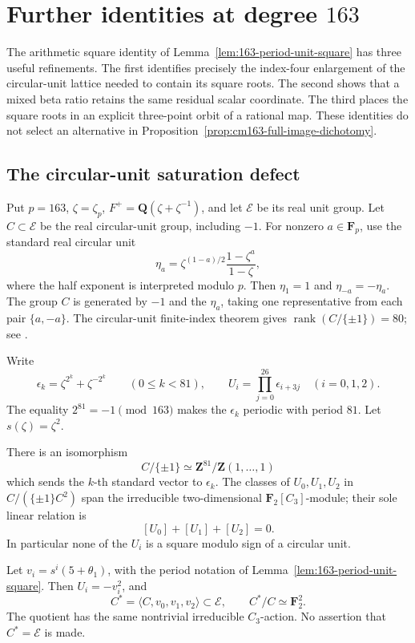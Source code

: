\section{Further identities at degree \(163\)}
\label{sec:163-additional-identities}

The arithmetic square identity of
Lemma~\ref{lem:163-period-unit-square} has three useful refinements.
The first identifies precisely the index-four enlargement of the
circular-unit lattice needed to contain its square roots. The second
shows that a mixed beta ratio retains the same residual scalar
coordinate. The third places the square roots in an explicit
three-point orbit of a rational map. These identities do not select
an alternative in Proposition~\ref{prop:cm163-full-image-dichotomy}.

\subsection{The circular-unit saturation defect}

Put \(p=163\), \(\zeta=\zeta_p\), \(F^+=\mathbf Q(\zeta+\zeta^{-1})\),
and let \(\mathcal E\) be its real unit group.  Let \(C\subset\mathcal E\)
be the real circular-unit group, including \(-1\).  For nonzero
\(a\in\mathbf F_p\), use the standard real circular unit
\[
 \eta_a=\zeta^{(1-a)/2}\frac{1-\zeta^a}{1-\zeta},
\]
where the half exponent is interpreted modulo \(p\).
Then \(\eta_1=1\) and \(\eta_{-a}=-\eta_a\).  The group \(C\)
is generated by \(-1\) and the \(\eta_a\), taking one representative
from each pair \(\{a,-a\}\).
The circular-unit finite-index theorem gives
\(\operatorname{rank}(C/\{\pm1\})=80\); see
\cite[p.~206, the definition and index of \(C\)]{Dummit2020}.

Write
\[
 \epsilon_k=\zeta^{2^k}+\zeta^{-2^k}\qquad(0\leq k<81),
 \qquad
 U_i=\prod_{j=0}^{26}\epsilon_{i+3j}\quad(i=0,1,2).
\]
The equality \(2^{81}=-1\pmod {163}\) makes the \(\epsilon_k\)
periodic with period \(81\).  Let \(s(\zeta)=\zeta^2\).

\begin{proposition}
\label{prop:163-circular-unit-saturation}
There is an isomorphism
\[
 C/\{\pm1\}\simeq
 \mathbf Z^{81}/\mathbf Z(1,\ldots,1)
\]
which sends the \(k\)-th standard vector to \(\epsilon_k\).
The classes of \(U_0,U_1,U_2\) in \(C/(\{\pm1\}C^2)\)
span the irreducible two-dimensional \(\mathbf F_2[C_3]\)-module;
their sole linear relation is
\[
 [U_0]+[U_1]+[U_2]=0.
\]
In particular none of the \(U_i\) is a square modulo sign of a
circular unit.

Let \(v_i=s^i(5+\theta_1)\), with the period notation of Lemma~\ref{lem:163-period-unit-square}.
Then \(U_i=-v_i^2\), and
\[
 C^*=\langle C,v_0,v_1,v_2\rangle\subset\mathcal E,
 \qquad C^*/C\simeq\mathbf F_2^2.
\]
The quotient has the same nontrivial irreducible \(C_3\)-action.
No assertion that \(C^*=\mathcal E\) is made.
\end{proposition}


